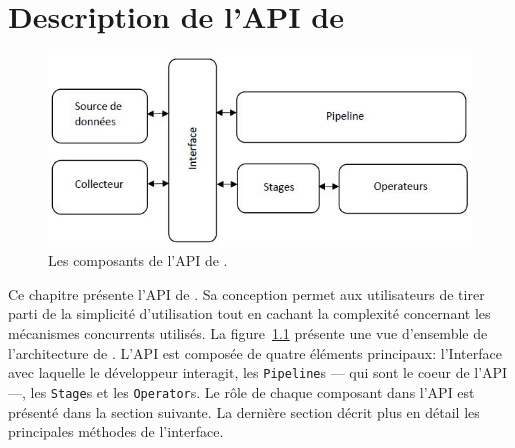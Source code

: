 
\chapter{Description de l'API de \PpFf}
\label{description.chap}


\begin{figure}[ht]
\centering
     \includegraphics[width=1.0\textwidth]{Figures/ComponentsAPI.jpg}
      \caption{Les composants de l'API de \ppff.}
       \label{ComponentsAPI.fig}
\end{figure}




Ce chapitre pr\'esente l'API de \ppff. Sa conception permet aux utilisateurs de tirer parti de la simplicit\'e d'utilisation tout en cachant la complexit\'e concernant les m\'ecanismes concurrents utilis\'es. La figure~\ref{ComponentsAPI.fig} pr\'esente une vue d'ensemble de l'architecture de \ppff. L'API est compos\'ee de quatre \'el\'ements principaux: l'Interface avec laquelle le d\'eveloppeur interagit, les \texttt{Pipeline}s --- qui sont le coeur de l'API ---, les \texttt{Stage}s et les \texttt{Operator}s. Le r\^ole de chaque composant dans l'API est pr\'esent\'e dans la section suivante. La derni\`ere section  d\'ecrit plus en d\'etail les principales m\'ethodes de l'interface.


